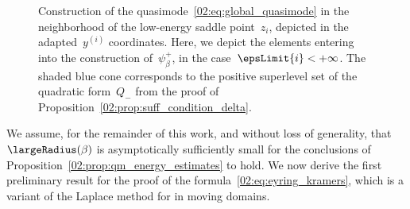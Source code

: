 \begin{figure}
                \caption[Local construction of the low-energy quasimode in~\cite{BLS25a}]{Construction of the quasimode~\eqref{02:eq:global_quasimode} in the neighborhood of the low-energy saddle point~$z_i$, depicted in the adapted~$y^{(i)}$ coordinates. Here, we depict the elements entering into the construction of~$\psi_\beta^{+}$, in the case~$\epsLimit{i}<+\infty$. The shaded blue cone corresponds to the positive superlevel set of the quadratic form~$Q_{-}$ from the proof of Proposition~\ref{02:prop:suff_condition_delta}.}
            \end{figure}

        We assume, for the remainder of this work, and without loss of generality, that~$\largeRadius(\beta)$ is asymptotically sufficiently small for the conclusions of Proposition~\ref{02:prop:qm_energy_estimates} to hold.
        We now derive the first preliminary result for the proof of the formula~\eqref{02:eq:eyring_kramers}, which is a variant of the Laplace method for in moving domains.
        
